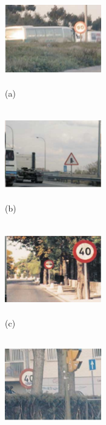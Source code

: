  \begin{figure}[h]
        \centering
        \begin{subfigure}
            \centering
            \includegraphics[width=4.2cm,height=4cm]{images/a.png} 
            \caption{(a)}
        \end{subfigure}
        \begin{subfigure}
            \centering
            \includegraphics[width=4.2cm,height=4cm]{images/b.png} 
            \caption{(b)}
        \end{subfigure}
        \begin{subfigure}
            \centering
            \includegraphics[width=4.2cm,height=4cm]{images/c3.png} 
            \caption{(c)}
        \end{subfigure}
        \begin{subfigure}
            \centering
            \includegraphics[width=4.2cm,height=4cm]{images/d.png} 

\end{subfigure}
\end{figure}
